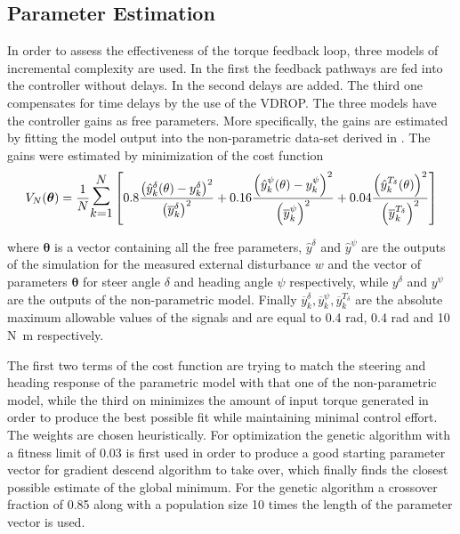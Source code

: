 \subsection{Parameter Estimation }

In order to assess the effectiveness of the torque feedback loop, three models of incremental complexity are used. In the first the feedback pathways are fed into the controller without delays. In the second delays are added. The third one compensates for time delays by the use of the VDROP. The three models have the  controller gains as free parameters. More specifically, the gains are estimated by fitting the model output into the non-parametric data-set derived in \cite{dialynaseffect}.  The gains were estimated by minimization of the cost function 
\begin{equation}
    V_{N}(\boldsymbol{\theta})=\frac{1}{N} \mathlarger{\mathlarger{\mathlarger{\sum}}}_{k=1}^{N}\left[0.8\frac{\left(\hat{y}^{\delta}_k(\mathbf{\theta})-y^\delta_k\right)^{2}}{\left(\overline{y}^{\delta}_k\right)^2}+0.16\frac{\left(\hat{y}^{\psi}_k(\mathbf{\theta})-y^\psi_k\right)^{2}}{\left(\overline{y}^{\psi}_k\right)^2}+0.04\frac{\left(\hat{y}^{T_\delta}_k(\mathbf{\theta})\right)^2}{\left(\overline{y}^{T_\delta}_k\right)^2}\right]
    \label{eq:cost}
    \end{equation}

where \ensuremath{\boldsymbol{\theta}} is a vector containing all the free parameters, \ensuremath{\hat{y}^{\delta}} and \ensuremath{\hat{y}^{\psi}} are the outputs of the simulation for the measured external disturbance \ensuremath{w} and the vector of parameters  \ensuremath{\boldsymbol{\theta}} for steer angle \ensuremath{\delta} and heading angle \ensuremath{\psi}  respectively, while \ensuremath{y^\delta} and \ensuremath{y^\psi} are the outputs of the non-parametric model. Finally \ensuremath{\overline{y}^{\delta}_k,\overline{y}^{\psi}_k,\overline{y}^{T_\delta}_k} are the absolute maximum allowable values of the  signals and are equal to 0.4 \si{\radian}, 0.4 \si{\radian} and 10 \si{N.m} respectively.

The first two terms  of the cost function are trying to match the steering and heading  response of the parametric model with that one of the non-parametric model, while the third on minimizes the amount of input torque generated in order to produce the best possible fit while maintaining minimal control effort. The weights are chosen heuristically. For optimization the genetic algorithm with a fitness limit of 0.03 is first  used in order to produce a good starting parameter vector for gradient descend algorithm to take over, which finally finds the closest possible estimate of the global minimum. For the genetic algorithm a crossover fraction of 0.85  along with a population size 10 times the length of the parameter vector is used.


